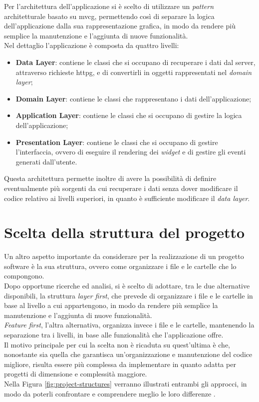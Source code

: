 Per l'architettura dell'applicazione si è scelto di utilizzare un \emph{pattern} architetturale basato su \gls{mvcg}\glsoccur \cite{site:app-architecture}, permettendo così di separare la logica dell'applicazione dalla sua rappresentazione grafica, in modo da rendere più semplice la manutenzione e l'aggiunta di nuove funzionalità.\\
Nel dettaglio l'applicazione è composta da quattro livelli:
\begin{itemize}
    \item \textbf{Data Layer}: contiene le classi che si occupano di recuperare i dati dal server, attraverso richieste \gls{httpg}\glsoccur, e di convertirli in oggetti rappresentati nel \emph{domain layer};
    \item \textbf{Domain Layer}: contiene le classi che rappresentano i dati dell'applicazione;
    \item \textbf{Application Layer}: contiene le classi che si occupano di gestire la logica dell'applicazione;
    \item \textbf{Presentation Layer}: contiene le classi che si occupano di gestire l'interfaccia, ovvero di eseguire il rendering dei \emph{widget} e di gestire gli eventi generati dall'utente.
\end{itemize}
Questa architettura permette inoltre di avere la possibilità di definire eventualmente più sorgenti da cui recuperare i dati senza dover modificare il codice relativo ai livelli superiori, in quanto è sufficiente modificare il \emph{data layer}.

\section{Scelta della struttura del progetto}
\label{sec:struttura-progetto}
Un altro aspetto importante da considerare per la realizzazione di un progetto software è la sua struttura, ovvero come organizzare i file e le cartelle che lo compongono.\\
Dopo opportune ricerche ed analisi, si è scelto di adottare, tra le due alternative disponibili, la struttura \emph{layer first}, che prevede di organizzare i file e le cartelle in base al livello a cui appartengono, in modo da rendere più semplice la manutenzione e l'aggiunta di nuove funzionalità.\\
\emph{Feature first}, l'altra alternativa, organizza invece i file e le cartelle, mantenendo la separazione tra i livelli, in base alle funzionalità che l'applicazione offre.\\
Il motivo principale per cui la scelta non è ricaduta su quest'ultima è che, nonostante sia quella che garantisca un'organizzazione e manutenzione del codice migliore, risulta essere più complessa da implementare in quanto adatta per progetti di dimensione e complessità maggiore.\\
Nella Figura \ref{fig:project-structures} verranno illustrati entrambi gli approcci, in modo da poterli confrontare e comprendere meglio le loro differenze \cite{site:project-structure}.

